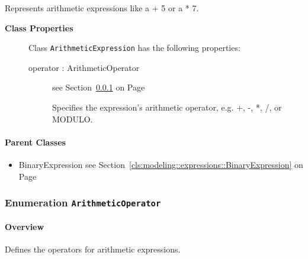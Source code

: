 	
			
Represents arithmetic expressions like a + 5 or a * 7.	
		
	


\begin{description}

	\item[\textbf{Class Properties}] Class \texttt{ArithmeticExpression} has the following properties:
	\begin{description}
\item[operator : ArithmeticOperator 	]
see Section~\ref{cls:modeling::expressions::ArithmeticOperator} on Page~\pageref{cls:modeling::expressions::ArithmeticOperator}
\hspace{\fill}
\nopagebreak


	
			
Specifies the expression's arithmetic operator, e.g. +, -, *, /, or MODULO.	
		
	
	\end{description}
	
	

\end{description}

\paragraph{Parent Classes}
\begin{itemize}
\item BinaryExpression see Section~\ref{cls:modeling::expressions::BinaryExpression} on Page~\pageref{cls:modeling::expressions::BinaryExpression}\end{itemize}
\subsubsection{\Large{Enumeration \bfseries \texttt{ArithmeticOperator}\normalfont}}
\label{cls:modeling::expressions::ArithmeticOperator} 
\paragraph{Overview}
	
			
Defines the operators for arithmetic expressions.	
		
	


